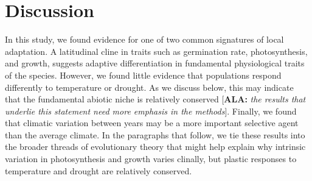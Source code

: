 \documentclass[11pt, oneside]{article}
\newcommand{\ala}[1]{{ \color{blue} [{\bf{ALA:}} {\em#1}]}} %
\begin{document}



\section*{Discussion}

In this study, we found evidence for one of two common signatures of local adaptation. A latitudinal cline in traits such as germination rate, photosynthesis, and growth, suggests adaptive differentiation in fundamental physiological traits of the species. However, we found little evidence that populations respond differently to temperature or drought. As we discuss below, this may indicate that the fundamental abiotic niche is relatively conserved \ala{the results that underlie this statement need more emphasis in the methods}. Finally, we found that climatic variation between years may be a more important selective agent than the average climate. In the paragraphs that follow, we tie these results into the broader threads of evolutionary theory that might help explain why intrinsic variation in photosynthesis and growth varies clinally, but plastic responses to temperature and drought are relatively conserved.
\end{document}
